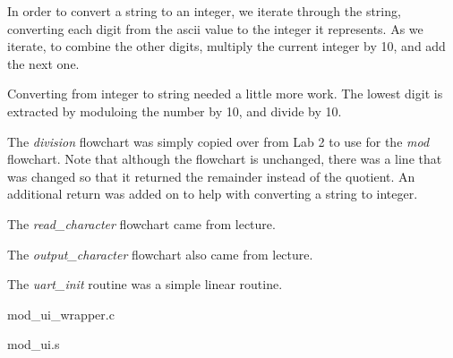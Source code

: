 \documentclass[letterpaper,10pt]{article}
\begin{document}
    In order to convert a string to an integer, we iterate through the string,
    converting each digit from the ascii value to the integer it represents.
    As we iterate, to combine the other digits, multiply the current integer
    by 10, and add the next one.

    Converting from integer to string needed a little more work. The lowest
    digit is extracted by moduloing the number by 10, and divide by 10.

    

    The \textit{division} flowchart was simply copied over from Lab 2 to use
    for the \textit{mod} flowchart. Note that although the flowchart is
    unchanged, there was a line that was changed so that it returned the
    remainder instead of the quotient. An additional return was added on
    to help with converting a string to integer.

    

    The \textit{read\_character} flowchart came from lecture.

    

    The \textit{output\_character} flowchart also came from lecture.

    

    The \textit{uart\_init} routine was a simple linear routine.
    

    mod\_ui\_wrapper.c
    

    mod\_ui.s
    
\end{document}
